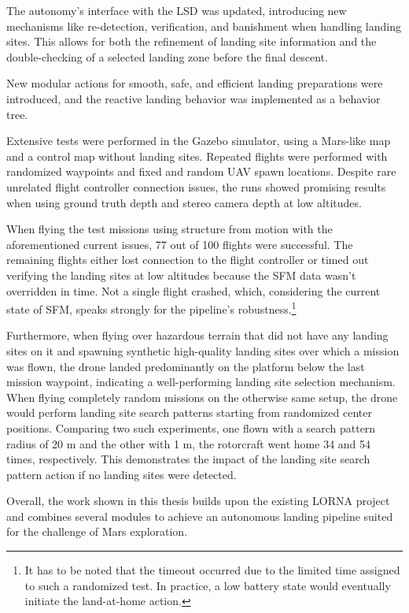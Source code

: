 The autonomy's interface with the LSD was updated, introducing new mechanisms like re-detection, verification, and banishment when handling landing sites. This allows for both the refinement of landing site information and the double-checking of a selected landing zone before the final descent.

New modular actions for smooth, safe, and efficient landing preparations were introduced, and the reactive landing behavior was implemented as a behavior tree.

Extensive tests were performed in the Gazebo simulator, using a Mars-like map and a control map without landing sites. Repeated flights were performed with randomized waypoints and fixed and random UAV spawn locations. Despite rare unrelated flight controller connection issues, the runs showed promising results when using ground truth depth and stereo camera depth at low altitudes. 

When flying the test missions using structure from motion with the aforementioned current issues, 77 out of 100 flights were successful. The remaining flights either lost connection to the flight controller or timed out verifying the landing sites at low altitudes because the SFM data wasn't overridden in time. Not a single flight crashed, which, considering the current state of SFM, speaks strongly for the pipeline's robustness.\footnote[1]{It has to be noted that the timeout occurred due to the limited time assigned to such a randomized test. In practice, a low battery state would eventually initiate the land-at-home action.}

Furthermore, when flying over hazardous terrain that did not have any landing sites on it and spawning synthetic high-quality landing sites over which a mission was flown, the drone landed predominantly on the platform below the last mission waypoint, indicating a well-performing landing site selection mechanism. When flying completely random missions on the otherwise same setup, the drone would perform landing site search patterns starting from randomized center positions. Comparing two such experiments, one flown with a search pattern radius of 20 m and the other with 1 m, the rotorcraft went home 34 and 54 times, respectively. This demonstrates the impact of the landing site search pattern action if no landing sites were detected.

Overall, the work shown in this thesis builds upon the existing LORNA project and combines several modules to achieve an autonomous landing pipeline suited for the challenge of Mars exploration. 
